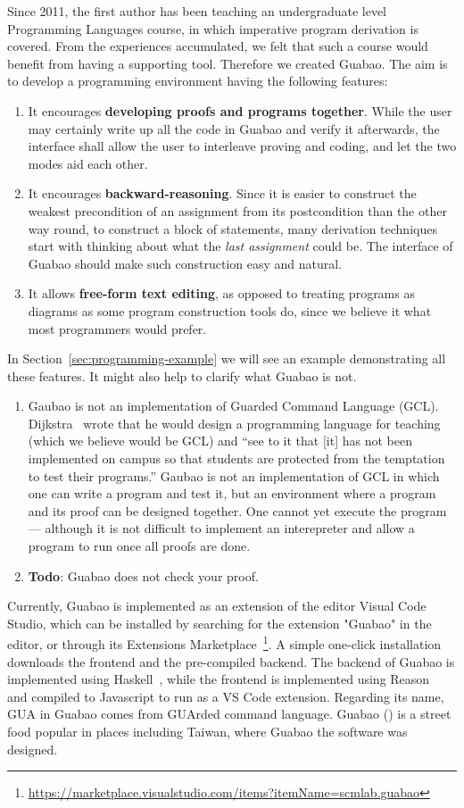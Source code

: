 \documentclass[runningheads]{llncs}
\newcommand{\todo}[1]{{\bf Todo}: \lbrack #1 \rbrack}
\begin{document}
Since 2011, the first author has been teaching an undergraduate level Programming Languages course, in which imperative program derivation is covered.
From the experiences accumulated, we felt that such a course would benefit from having a supporting tool.
Therefore we created Guabao.
The aim is to develop a programming environment having the following features:
\begin{enumerate}
\item It encourages {\bf developing proofs and programs together}.
While the user may certainly write up all the code in Guabao and verify it afterwards, the interface shall allow the user to interleave proving and coding, and let the two modes aid each other.
\item It encourages {\bf backward-reasoning}.
Since it is easier to construct the weakest precondition of an assignment from its postcondition than the other way round,
to construct a block of statements, many derivation techniques start with thinking about what the \emph{last assignment} could be.
The interface of Guabao should make such construction easy and natural.
\item It allows {\bf free-form text editing}, as opposed to treating programs as diagrams as some program construction tools do, since we believe it what most programmers would prefer.
\end{enumerate}
In Section~\ref{sec:programming-example} we will see an example demonstrating all these features.
It might also help to clarify what Guabao is not.
\begin{enumerate}
\item Gaubao is not an implementation of Guarded Command Language (GCL).
Dijkstra~\cite{Dijkstra:98:Cruelty} wrote that he would
design a programming language for teaching (which we believe would be GCL) and ``see to it that [it] has not been implemented on campus so that students are protected from the temptation to test their programs.''
Gaubao is not an implementation of GCL in which one can write a program and test it, but an environment where a program and its proof can be designed together.
One cannot yet execute the program --- although it is not difficult to implement an interepreter and allow a program to run once all proofs are done.
\item \todo{Guabao does not check your proof.}
\end{enumerate}

Currently, Guabao is implemented as an extension of the editor Visual Code Studio,
which can be installed by searching for the extension "Guabao" in the editor, or through its Extensions Marketplace~\footnote{\url{https://marketplace.visualstudio.com/items?itemName=scmlab.guabao}}.
A simple one-click installation downloads the frontend and the pre-compiled backend.
The backend of Guabao is implemented using Haskell~\cite{PeytonJones:03:Haskell}, while the frontend is implemented using Reason~\cite{Walke:16:Reason} and compiled to Javascript to run as a VS Code extension.
Regarding its name,
GUA in Guabao comes from GUArded command language.
Guabao () is a street food popular in places including Taiwan, where Guabao the software was designed.
\end{document}
